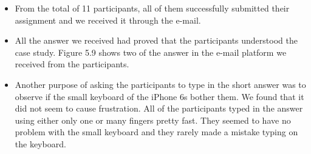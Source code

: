 \begin{itemize}
\item From the total of 11 participants, all of them successfully submitted their assignment and we received it through the e-mail. 
\item All the answer we received had proved that the participants understood the case study. Figure 5.9 shows two of the answer in the e-mail platform we received from the participants. 
\item Another purpose of asking the participants to type in the short answer was to observe if the small keyboard of the iPhone 6s bother them. We found that it did not seem to cause frustration. All of the participants typed in the answer using either only one or many fingers pretty fast. They seemed to have no problem with the small keyboard and they rarely made a mistake typing on the keyboard. 
\end{itemize}
\newpage 
